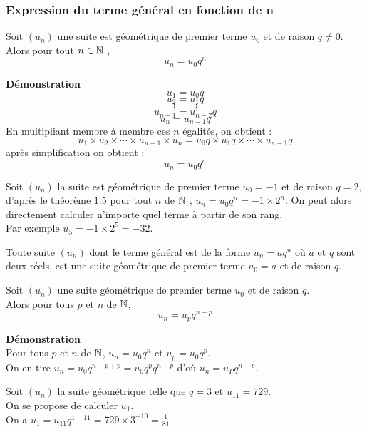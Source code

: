 \subsubsection*{Expression du terme général en fonction de n}
\begin{theorem} Soit $(u_{n})$ une  suite est géométrique de premier terme $u_{0} $ et de raison $ q\neq 0 $. Alors pour tout $ n\in\mathbb{N} $  , $$  u_{n}= u_{0}q^{n}$$
\end{theorem}
\textbf{Démonstration } \[u_{1}=u_{0}q\]\[u_{2}=u_{1}q\]\[\vdots \qquad \vdots\] \[u_{n-1}=u_{n-2}q\]\[u_{n}=u_{n-1}q\]En multipliant membre à membre ces $ n $ égalités, on obtient :\[u_{1}\times u_{2} \times \cdots \times u_{n-1}\times u_{n}= u_{0}q \times u_{1}q  \times \cdots \times u_{n-1}q\] après  simplification on obtient :\[u_{n}= u_{0}q^{n}\] 
\begin{example} 

Soit $(u_{n})$ la  suite est géométrique  de premier terme $u_{0}=-1 $ et de raison $ q=2$, d'après le théorème $ 1.5 $ pour tout $n $ de $\mathbb{N} $ , $ u_{n}=u_{0}q^{n}=-1\times 2^{n} $. On peut alors directement calculer n'importe quel terme à partir de son rang. \\Par exemple $ u_{5}=-1\times2^{5}=-32 $.
\end{example}
\begin{remark}
Toute suite $(u_{n})$ dont le  terme général  est de la forme $ u_{n}=aq^{n} $  où $a $ et $ q $ sont deux réels, est une suite géométrique de premier terme $u_{0}= a $ et de raison $ q $. 
\end{remark}
 
 \begin{theorem} 
 Soit $(u_{n})$ une  suite  géométrique  de premier terme $u_{0} $ et de raison $ q $.\\   Alors pour tous $ p $ et  $ n$ de $\mathbb{N} $, $$u_{n}= u_{p}q^{n-p}$$
 \end{theorem}
 \textbf{Démonstration} \\ Pour tous $ p $ et  $ n$ de $\mathbb{N} $, $ u_{n}= u_{0}q^{n}$ et $ u_{p}= u_{0}q^{p}$.  \\On en tire \quad $ u_{n}=u_{0}q^{n-p+p}= u_{0}q^{p}q^{n-p}$ \quad d'où \quad $ u_{n}= u_{P}q^{n-p}$.
\begin{example}
 Soit  $(u_{n})$ la  suite  géométrique  telle que  $q=3 $ et $u_{11}=729 $.\\ On se propose de calculer  $u_{1} $. \\On a $ u_{1}=u_{11}q^{1-11}=729\times 3^{-10}=\frac{1}{81} $
 \end{example}
